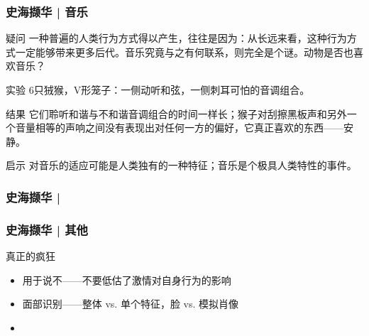 \begin{frame}
  \frametitle{史海撷华 | 音乐}
  \begin{block}{疑问}
      一种普遍的人类行为方式得以产生，往往是因为：从长远来看，这种行为方式一定能够带来更多后代。音乐究竟与之有何联系，则完全是个谜。动物是否也喜欢音乐？
  \end{block}
  \vspace{-0.5em}
  \pause
  \begin{block}{实验}
    6只狨猴，V形笼子：一侧动听和弦，一侧刺耳可怕的音调组合。
  \end{block}
  \vspace{-0.5em}
  \pause
  \begin{block}{结果}
    它们聆听和谐与不和谐音调组合的时间一样长；猴子对刮擦黑板声和另外一个音量相等的声响之间没有表现出对任何一方的偏好，它真正喜欢的东西——安静。
  \end{block}
  \vspace{-0.5em}
  \pause
  \begin{block}{启示}
    对音乐的适应可能是人类独有的一种特征；音乐是个极具人类特性的事件。
  \end{block}
\end{frame}

% 
\begin{frame}
  \frametitle{史海撷华 | }
\end{frame}

\begin{frame}
  \frametitle{史海撷华 | 其他}
  \begin{block}{真正的疯狂}
  \begin{itemize}
    \item 用于说不——不要低估了激情对自身行为的影响
    \item 面部识别——整体 vs. 单个特征，脸 vs. 模拟肖像
    \item 
  \end{itemize}
  \end{block}
\end{frame}



